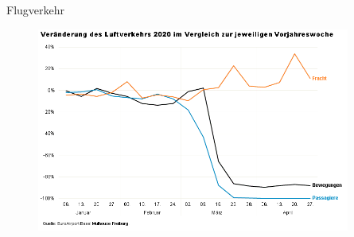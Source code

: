\begin{frame}{Flugverkehr}
        \begin{figure}[t]
            \centering
            \includegraphics[height=190pt]{img_niklas/flugverkehr.PNG}
            \label{fig:my_label}
        \end{figure}
\end{frame}


